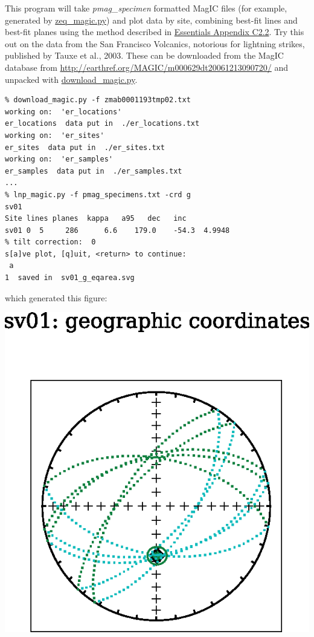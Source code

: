 \documentclass[11pt]{book}
\begin{document}
{{This program will take {\it pmag\_specimen} formatted MagIC files (for example, generated by \href{#zeq_magic.py}{zeq\_magic.py}) and plot data by site, combining best-fit lines and best-fit planes using the method described in  \href{http://earthref.org/MAGIC/books/Tauxe/Essentials/WebBook3ap3.html#linesNplanes}{Essentials Appendix C2.2}.  Try this out on the data from the San Francisco Volcanics, notorious for lightning strikes, published by Tauxe et al., 2003. \nocite{tauxe03b}  These can be downloaded from the MagIC database from \url{http://earthref.org/MAGIC/m000629dt20061213090720/} and unpacked with
\href{#download_magic.py}{download\_magic.py}.


\begin{verbatim}
% download_magic.py -f zmab0001193tmp02.txt
working on:  'er_locations'
er_locations  data put in  ./er_locations.txt
working on:  'er_sites'
er_sites  data put in  ./er_sites.txt
working on:  'er_samples'
er_samples  data put in  ./er_samples.txt
...
% lnp_magic.py -f pmag_specimens.txt -crd g
sv01
Site lines planes  kappa   a95   dec   inc
sv01 0  5     286      6.6    179.0    -54.3  4.9948
% tilt correction:  0
s[a]ve plot, [q]uit, <return> to continue:
 a
1  saved in  sv01_g_eqarea.svg

\end{verbatim}

\noindent which generated this figure:

\includegraphics[width=12 cm]{EPSfiles/lnp-ex.eps}

}}
\end{document}
